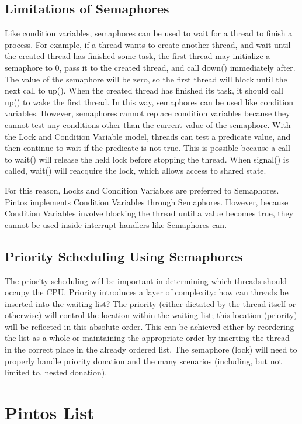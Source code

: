 \documentclass[11pt, letterpaper]{article}
\begin{document}
\subsection{Limitations of Semaphores}
Like condition variables, semaphores can be used to wait for a thread to finish a process. For example, if a thread wants to create another thread, and wait until the created thread has finished some task, the first thread may initialize a semaphore to 0, pass it to the created thread, and call down() immediately after. The value of the semaphore will be zero, so the first thread will block until the next call to up(). When the created thread has finished its task, it should call up() to wake the first thread.
In this way, semaphores can be used like condition variables. However, semaphores cannot replace condition variables because they cannot test any conditions other than the current value of the semaphore. With the Lock and Condition Variable model, threads can test a predicate value, and then continue to wait if the predicate is not true. This is possible because a call to wait() will release the held lock before stopping the thread. When signal() is called, wait() will reacquire the lock, which allows access to shared state.

For this reason, Locks and Condition Variables are preferred to Semaphores. Pintos implements Condition Variables through Semaphores. However, because Condition Variables involve blocking the thread until a value becomes true, they cannot be used inside interrupt handlers like Semaphores can. 

\subsection{Priority Scheduling Using Semaphores}
The priority scheduling will be important in determining which threads should occupy the CPU. Priority introduces a layer of complexity: how can threads be inserted into the waiting list?  The priority (either dictated by the thread itself or otherwise) will control the location within the waiting list; this location (priority) will be reflected in this absolute order. This can be achieved either by reordering the list as a whole or maintaining the appropriate order by inserting the thread in the correct place in the already ordered list. The semaphore (lock) will need to properly handle priority donation and the many scenarios (including, but not limited to, nested donation). 


\section{Pintos List}
\end{document}
